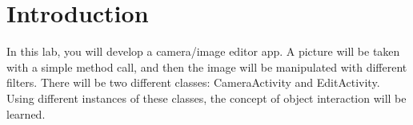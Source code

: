 \section{Introduction}

In this lab, you will develop a camera/image editor app. A picture will be taken with a simple method call, and then the image will be manipulated with different filters. There will be two different classes: CameraActivity and EditActivity. Using different instances of these classes, the concept of object interaction will be learned.



